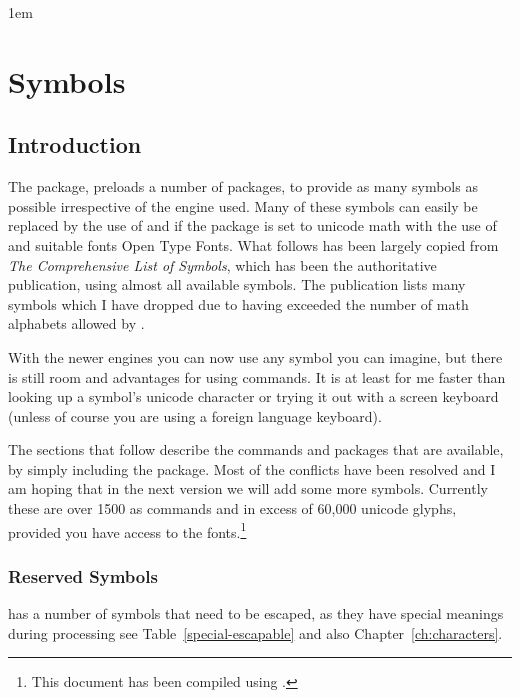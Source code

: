 \parindent1em
\chapter{Symbols}

\section{Introduction}
\label{ch:comprehensivesymbols}

The  package, preloads a number of packages, to provide as
many symbols as possible irrespective of the \tex engine used. Many of these
symbols can easily be replaced by the use of  and if
the package is set to unicode math with the use of and suitable fonts Open Type Fonts. What follows has been largely copied from \emph{The Comprehensive List of \latexe Symbols}, which has been the authoritative publication, using almost all available symbols. 
The publication lists many symbols which I have dropped due to having exceeded the number of math alphabets allowed by \tex. 


With the newer engines \xetex \luatex you can now use any symbol you can imagine, but there is still room and advantages for using commands. It is at least for me faster than looking up a symbol's unicode character or trying it out with a screen keyboard (unless of course you are using a foreign language keyboard). 

The sections that follow describe the commands and packages that are
available, by simply including the  package. Most of the conflicts have been resolved and I am hoping that in the next version we will add some more symbols. 
Currently these are over 1500 as commands and in excess of 60,000 unicode glyphs, provided you have access to the fonts.\footnote{This document has been compiled using \luatex.}
  

\subsection{Reserved Symbols}

\tex has a number of symbols that need to be escaped, as they have 
special meanings during processing see Table~\vref{special-escapable} and also Chapter~\vref{ch:characters}.

\bigskip


